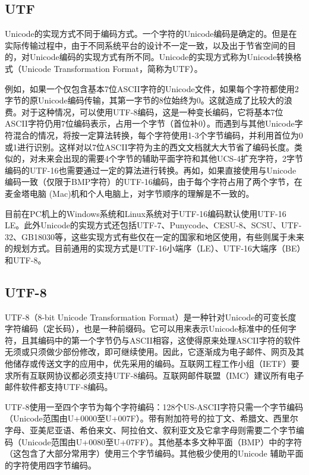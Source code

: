 \subsection{UTF}
Unicode的实现方式不同于编码方式。一个字符的Unicode编码是确定的。但是在实际传输过程中，由于不同系统平台的设计不一定一致，以及出于节省空间的目的，对Unicode编码的实现方式有所不同。Unicode的实现方式称为Unicode转换格式（Unicode Transformation Format，简称为UTF）。

例如，如果一个仅包含基本7位ASCII字符的Unicode文件，如果每个字符都使用2字节的原Unicode编码传输，其第一字节的8位始终为0。这就造成了比较大的浪费。对于这种情况，可以使用UTF-8编码，这是一种变长编码，它将基本7位ASCII字符仍用7位编码表示，占用一个字节（首位补0）。而遇到与其他Unicode字符混合的情况，将按一定算法转换，每个字符使用1-3个字节编码，并利用首位为0或1进行识别。这样对以7位ASCII字符为主的西文文档就大大节省了编码长度。类似的，对未来会出现的需要4个字节的辅助平面字符和其他UCS-4扩充字符，2字节编码的UTF-16也需要通过一定的算法进行转换。再如，如果直接使用与Unicode编码一致（仅限于BMP字符）的UTF-16编码，由于每个字符占用了两个字节，在麦金塔电脑 (Mac)机和个人电脑上，对字节顺序的理解是不一致的。

目前在PC机上的Windows系统和Linux系统对于UTF-16编码默认使用UTF-16 LE。此外Unicode的实现方式还包括UTF-7、Punycode、CESU-8、SCSU、UTF-32、GB18030等，这些实现方式有些仅在一定的国家和地区使用，有些则属于未来的规划方式。目前通用的实现方式是UTF-16小端序（LE）、UTF-16大端序（BE）和UTF-8。

\subsection{UTF-8}
UTF-8（8-bit Unicode Transformation Format）是一种针对Unicode的可变长度字符编码（定长码），也是一种前缀码。它可以用来表示Unicode标准中的任何字符，且其编码中的第一个字节仍与ASCII相容，这使得原来处理ASCII字符的软件无须或只须做少部份修改，即可继续使用。因此，它逐渐成为电子邮件、网页及其他储存或传送文字的应用中，优先采用的编码。互联网工程工作小组（IETF）要求所有互联网协议都必须支持UTF-8编码。互联网邮件联盟（IMC）建议所有电子邮件软件都支持UTF-8编码。

UTF-8使用一至四个字节为每个字符编码：128个US-ASCII字符只需一个字节编码（Unicode范围由U+0000至U+007F）。带有附加符号的拉丁文、希腊文、西里尔字母、亚美尼亚语、希伯来文、阿拉伯文、叙利亚文及它拿字母则需要二个字节编码（Unicode范围由U+0080至U+07FF）。其他基本多文种平面（BMP）中的字符（这包含了大部分常用字）使用三个字节编码。其他极少使用的Unicode 辅助平面的字符使用四字节编码。

